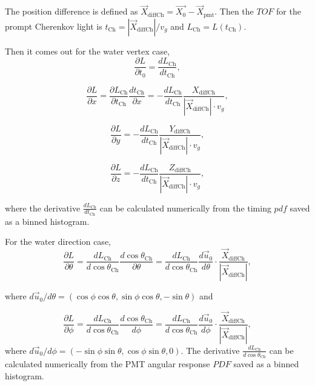 The position difference is defined as $\vec{X}_{{\mathrm{diffCh}}} = \vec{X_0}-\vec{X}_{\mathrm{pmt}}$. Then the $TOF$ for the prompt Cherenkov light is $t_{\mathrm{Ch}}=|\vec{X}_{{\mathrm{diffCh}}}|/v_g$ and $L_{\mathrm{Ch}}=L(t_{\mathrm{Ch}})$.

Then it comes out for the water vertex case,
\begin{equation}
\frac{\partial L}{\partial t_0}=\frac{dL_{\mathrm{Ch}}}{dt_{\mathrm{Ch}}},
\end{equation}

\begin{equation}
\frac{\partial L}{\partial x}=\frac{\partial L_{\mathrm{Ch}}}{\partial t_{\mathrm{Ch}}}\frac{dt_{\mathrm{Ch}}}{\partial x}=-\frac{dL_{\mathrm{Ch}}}{dt_{\mathrm{Ch}}}\frac{X_{{\mathrm{diffCh}}}}{|\vec{X}_{{\mathrm{diffCh}}}|\cdot v_g},
\end{equation}

\begin{equation}
\frac{\partial L}{\partial y}=-\frac{dL_{\mathrm{Ch}}}{dt_{\mathrm{Ch}}}\frac{Y_{{\mathrm{diffCh}}}}{|\vec{X}_{{\mathrm{diffCh}}}|\cdot v_g},
\end{equation}

\begin{equation}
\frac{\partial L}{\partial z}=-\frac{dL_{\mathrm{Ch}}}{dt_{\mathrm{Ch}}}\frac{Z_{{\mathrm{diffCh}}}}{|\vec{X}_{{\mathrm{diffCh}}}|\cdot v_g},
\end{equation}

where the derivative $\frac{dL_{\mathrm{Ch}}}{dt_{\mathrm{Ch}}}$ can be calculated numerically from the timing $pdf$ saved as a binned histogram.

For the water direction case,
\begin{equation}
\frac{\partial L}{\partial\theta}=\frac{dL_{\mathrm{Ch}}}{d\cos\theta_{\mathrm{Ch}}}\frac{d\cos\theta_{\mathrm{Ch}}}{\partial\theta}
=\frac{dL_{\mathrm{Ch}}}{d\cos\theta_{\mathrm{Ch}}}\frac{d\vec{u}_0}{d\theta}\cdot\frac{\vec{X}_{{\mathrm{diffCh}}}}{|\vec{X}_{{\mathrm{diffCh}}}|},
\end{equation}

where $d\vec{u}_0/d\theta=(\cos\phi\cos\theta, \sin\phi\cos\theta, -\sin\theta)$ and 

\begin{equation}
\frac{\partial L}{\partial\phi}=\frac{dL_{\mathrm{Ch}}}{d\cos\theta_{\mathrm{Ch}}}\frac{d\cos\theta_{\mathrm{Ch}}}{d\phi}
=\frac{dL_{\mathrm{Ch}}}{d\cos\theta_{\mathrm{Ch}}}\frac{d\vec{u}_0}{d\phi}\cdot\frac{\vec{X}_{{\mathrm{diffCh}}}}{|\vec{X}_{{\mathrm{diffCh}}}|},
\end{equation} 
where $d\vec{u}_0/d\phi=(-\sin\phi\sin\theta, \cos\phi\sin\theta, 0)$. The derivative $\frac{dL_{\mathrm{Ch}}}{d\cos\theta_{\mathrm{Ch}}}$ can be calculated numerically from the PMT angular response $PDF$ saved as a binned histogram.

